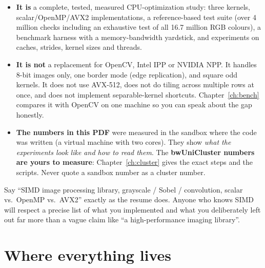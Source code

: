 \begin{itemize}
\item \textbf{It is} a complete, tested, measured CPU-optimization study: three kernels, scalar/OpenMP/AVX2 implementations, a reference-based test suite (over 4 million checks including an exhaustive test of all 16.7 million RGB colours), a benchmark harness with a memory-bandwidth yardstick, and experiments on caches, strides, kernel sizes and threads.
\item \textbf{It is not} a replacement for OpenCV, Intel IPP or NVIDIA NPP. It handles 8-bit images only, one border mode (edge replication), and square odd kernels. It does not use AVX-512, does not do tiling across multiple rows at once, and does not implement separable-kernel shortcuts. Chapter~\ref{ch:bench} compares it with OpenCV on one machine so you can speak about the gap honestly.
\item \textbf{The numbers in this PDF} were measured in the sandbox where the code was written (a virtual machine with two cores). They show \emph{what the experiments look like and how to read them}. The \textbf{bwUniCluster numbers are yours to measure}: Chapter~\ref{ch:cluster} gives the exact steps and the scripts. Never quote a sandbox number as a cluster number.
\end{itemize}

\begin{warn}
Say ``SIMD image processing library, grayscale / Sobel / convolution, scalar vs.\ OpenMP vs.\ AVX2'' exactly as the resume does. Anyone who knows SIMD will respect a precise list of what you implemented and what you deliberately left out far more than a vague claim like ``a high-performance imaging library''.
\end{warn}

\section{Where everything lives}

